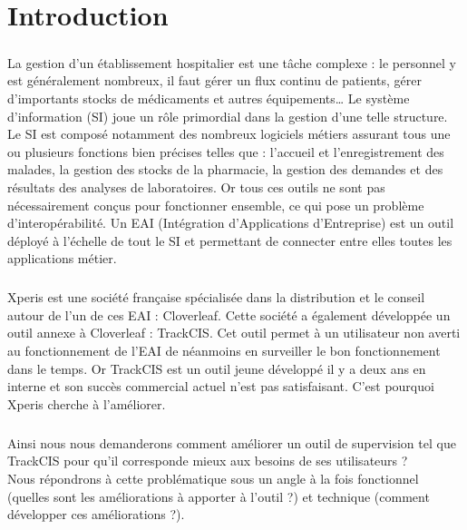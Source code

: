 \chapter*{Introduction}
	\paragraph{}
	La gestion d'un établissement hospitalier est une tâche complexe :
	le personnel y est généralement nombreux, il faut gérer un flux continu de
	patients, gérer d'importants stocks de médicaments et autres équipements\ldots
	Le système d'information (SI) joue un rôle primordial dans la gestion d'une
	telle structure. Le SI est composé notamment des nombreux logiciels métiers
	assurant tous une ou plusieurs fonctions bien précises telles que : l'accueil
	et l'enregistrement des malades, la gestion des stocks de la pharmacie, la gestion
	des demandes et des résultats des analyses de laboratoires. Or tous ces
	outils ne sont pas nécessairement conçus pour fonctionner ensemble, ce qui
	pose un problème d'interopérabilité. Un EAI (Intégration d'Applications d'Entreprise)
	est un outil déployé à l'échelle de tout le SI et permettant de connecter
	entre elles toutes les applications métier.
	
	\paragraph{}
	Xperis est une société française spécialisée dans la distribution et le conseil
	autour de l'un de ces EAI : Cloverleaf. Cette société a également développée
	un outil annexe à Cloverleaf : TrackCIS. Cet outil permet à un utilisateur non
	averti au fonctionnement de l'EAI de néanmoins en surveiller le bon
	fonctionnement dans le temps. Or TrackCIS est un outil jeune développé il y a
	deux ans en interne et son succès commercial actuel n'est pas satisfaisant.
	C'est pourquoi Xperis cherche à l'améliorer.
	
	\paragraph{}
	Ainsi nous nous demanderons comment améliorer un outil de supervision tel que
	TrackCIS pour qu'il corresponde mieux aux besoins de ses utilisateurs ?\\
	Nous répondrons à cette problématique sous un angle à la fois fonctionnel
	(quelles sont les améliorations à apporter à l'outil ?) et technique (comment
	développer ces améliorations ?).
	
